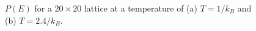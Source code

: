 \documentclass[12pt]{article}
\numberwithin{equation}{section}
\begin{document}
\begin{figure}[h]
\begin{center}
\caption{$P(E)$ for a $20\times20$ lattice at a temperature of (a) $T=1/k_{B}$ and (b) $T=2.4/k_{B}$.}
\label{fig:size20pofE}
\end{center}
\end{figure}
\end{document}
